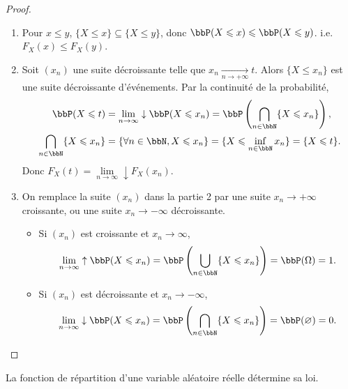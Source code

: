 \begin{proof}
    $\ $
    \begin{enumerate}
        \item Pour $x \leqslant y$, $\{ X \leqslant x \} \subseteq \{ X \leqslant y \}$,
              donc $\bbP(X \leqslant x) \leqslant \bbP(X \leqslant y)$.
              i.e. $F_X(x) \leqslant F_X(y)$.
        \item Soit $(x_n)$ une suite décroissante telle que $x_n \underset{n \to +\infty}{\to} t$.
              Alors $\{ X \leqslant x_n \}$ est une suite décroissante d'événements.
              Par la continuité de la probabilité,
              \begin{align*}
                  \bbP(X \leqslant t)                        & = \lim_{n \to \infty} \downarrow \bbP(X \leqslant x_n)
                  = \bbP \left(\bigcap_{n \in \bbN} \{ X \leqslant x_n \}\right),                                     \\
                  \bigcap_{n \in \bbN} \{ X \leqslant x_n \} & = \{ \forall n \in \bbN, X \leqslant x_n \}
                  = \{ X \leqslant \inf_{n \in \bbN} x_n \} = \{ X \leqslant t \}.
              \end{align*}
              Donc $F_X(t) = \lim\limits_{n \to \infty} \downarrow F_X(x_n)$.
        \item On remplace la suite $(x_n)$ dans la partie 2 par une suite $x_n \to +\infty$ croissante,
              ou une suite $x_n \to -\infty$ décroissante.
              \begin{itemize}
                  \item Si $(x_n)$ est croissante et $x_n \to \infty$,
                        \[ \lim_{n \to \infty} \uparrow \bbP(X \leqslant x_n) =
                            \bbP \left(\bigcup_{n \in \bbN} \{ X \leqslant x_n \}\right) = \bbP(\Omega) = 1. \]
                  \item Si $(x_n)$ est décroissante et $x_n \to -\infty$,
                        \[ \lim_{n \to \infty} \downarrow \bbP(X \leqslant x_n) =
                            \bbP \left(\bigcap_{n \in \bbN} \{ X \leqslant x_n \}\right) = \bbP(\varnothing) = 0. \qedhere \]
              \end{itemize}
    \end{enumerate}
\end{proof}

\begin{thm}[admis]
    La fonction de répartition d'une variable aléatoire réelle détermine sa loi.
\end{thm}

